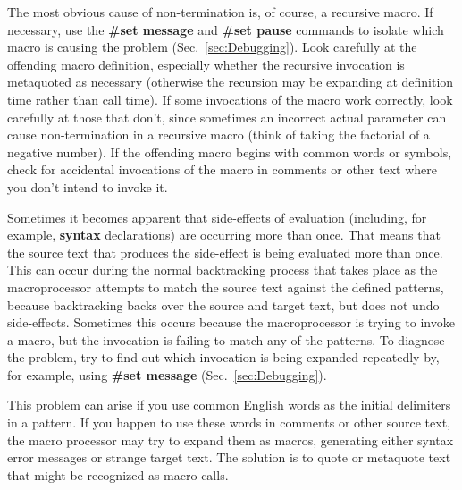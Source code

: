 \documentclass[12pt]{article}
\begin{document}
The most obvious cause of non-termination is, of course, a recursive macro.
If necessary, use the \textbf{\#set message} and \textbf{\#set pause} commands to isolate which macro is causing the problem (Sec.\ \ref{sec:Debugging}).
Look carefully at the offending macro definition, especially whether the recursive invocation is metaquoted as necessary (otherwise the recursion may be expanding at definition time rather than call time).
If some invocations of the macro work correctly, look carefully at those that don't, since sometimes an incorrect actual parameter can cause non-termination in a recursive macro
(think of taking the factorial of a negative number).
If the offending macro begins with common words or symbols, check for accidental invocations of the macro in comments or other text where you don't intend to invoke it.

Sometimes it becomes apparent that side-effects of evaluation (including, for example, \textbf{syntax} declarations) are occurring more than once.
That means that the source text that produces the side-effect is being evaluated more than once.
This can occur during the normal backtracking process that takes place as the macroprocessor attempts to match the source text against the defined patterns, because backtracking backs over the source and target text, but does not undo side-effects.
Sometimes this occurs because the macroprocessor is trying to invoke a macro, but the invocation is failing to match any of the patterns.
To diagnose the problem, try to find out which invocation is being expanded repeatedly by, for example, using \textbf{\#set message}  (Sec.\ \ref{sec:Debugging}).

This problem can arise if you use common English words as the initial delimiters in a pattern.
If you happen to use these words in comments or other source text, the macro processor may try to expand them as macros, generating either syntax error messages or strange target text.
The solution is to quote or metaquote text that might be recognized as macro calls.
\end{document}
